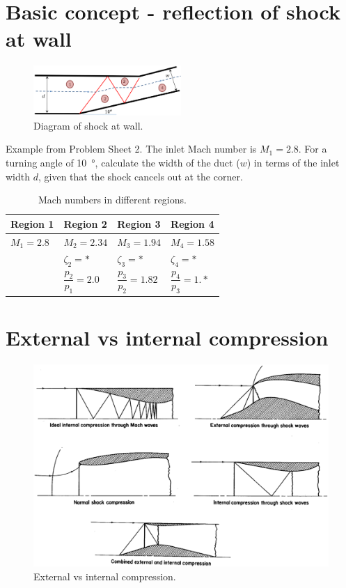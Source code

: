 \section{Basic concept - reflection of shock at wall}
\begin{figure}[H]
    \centering
    \includegraphics[width = 0.5\textwidth]{./img/diagram48.png}
    \caption{Diagram of shock at wall.}
\end{figure}
Example from Problem Sheet 2. The inlet Mach number is $M_1 = 2.8$. For a turning angle of \SI{10}{\degree}, calculate the width of the duct ($w$) in terms of the inlet width $d$, given that the shock cancels out at the corner.
\begin{table}[H]
    \centering
    \begin{tabular}{@{}llll@{}}
        \toprule
        Region 1    & Region 2                 & Region 3                  & Region 4                 \\ \midrule
        $M_1 = 2.8$ & $M_2 = 2.34$             & $M_3 = 1.94$              & $M_4 = 1.58$             \\
                    & $\zeta_2 = *$            & $\zeta_3 = *$             & $\zeta_4 = *$            \\
                    & $\dfrac{p_2}{p_1} = 2.0$ & $\dfrac{p_3}{p_2} = 1.82$ & $\dfrac{p_4}{p_3} = 1.*$ \\ \bottomrule
    \end{tabular}
    \caption{Mach numbers in different regions.}
\end{table}
\section{External vs internal compression}
\begin{figure}[H]
    \centering
    \includegraphics[width = \textwidth]{./img/diagram49.png}
    \caption{External vs internal compression.}
\end{figure}

